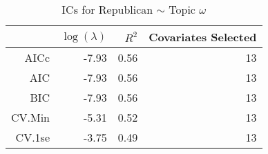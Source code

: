 \begin{table}[ht]
\centering
\begin{tabular}{rrrr}
  \hline
 & $\log(\lambda)$ & $R^2$ & Covariates Selected \\ 
  \hline
AICc & -7.93 & 0.56 &  13 \\ 
  AIC & -7.93 & 0.56 &  13 \\ 
  BIC & -7.93 & 0.56 &  13 \\ 
  CV.Min & -5.31 & 0.52 &  13 \\ 
  CV.1se & -3.75 & 0.49 &  13 \\ 
   \hline
\end{tabular}
\caption{ICs for Republican $\sim$ Topic $\omega$} 
\label{tab:topic_rep}
\end{table}
